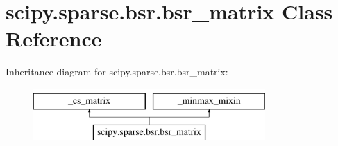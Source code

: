 \hypertarget{classscipy_1_1sparse_1_1bsr_1_1bsr__matrix}{}\section{scipy.\+sparse.\+bsr.\+bsr\+\_\+matrix Class Reference}
\label{classscipy_1_1sparse_1_1bsr_1_1bsr__matrix}
Inheritance diagram for scipy.\+sparse.\+bsr.\+bsr\+\_\+matrix\+:\begin{figure}[H]
\begin{center}
\leavevmode
\includegraphics[height=2.000000cm]{classscipy_1_1sparse_1_1bsr_1_1bsr__matrix}
\end{center}
\end{figure}
